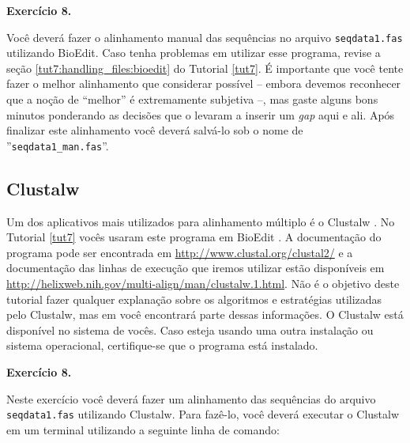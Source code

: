 \begin{refsection}
\begin{blackBlock}{\textbf{Exercício 8.}}\label{tut8:ex:8.1}

Você deverá fazer o alinhamento manual das sequências no arquivo \texttt{seqdata1.fas} utilizando BioEdit. Caso tenha problemas em utilizar esse programa, revise a seção \ref{tut7:handling_files:bioedit} do Tutorial \ref{tut7}. É importante que você tente fazer o melhor alinhamento que considerar possível -- embora devemos reconhecer que a noção de ``melhor'' é extremamente subjetiva --, mas gaste alguns bons minutos ponderando as decisões que o levaram a inserir um \textit{gap} aqui e ali. Após finalizar este alinhamento você deverá salvá-lo sob o nome de ''\texttt{seqdata1\_man.fas}''.

\end{blackBlock}

\subsection{Clustalw}\label{tut8:msa:clustalw}

Um dos aplicativos mais utilizados para alinhamento múltiplo é o Clustalw \parencite{Larkin_et_al_2007}. No Tutorial \ref{tut7} vocês usaram este programa em BioEdit \parencite{Hall_1999}. A documentação do programa pode ser encontrada em \url{http://www.clustal.org/clustal2/} e a documentação das linhas de execução que iremos utilizar estão disponíveis em \url{http://helixweb.nih.gov/multi-align/man/clustalw.1.html}. Não é o objetivo deste tutorial fazer qualquer explanação sobre os algoritmos e estratégias utilizadas pelo Clustalw, mas em \textcite{Phillips_et_al_2000} você encontrará parte dessas informações. O Clustalw está disponível no sistema de vocês. Caso esteja usando uma outra instalação ou sistema operacional, certifique-se que o programa está instalado.


\begin{blackBlock}{\textbf{Exercício 8.}}\label{tut8:ex:8.2}

Neste exercício você deverá fazer um alinhamento das sequências do arquivo \texttt{seqdata1.fas} utilizando Clustalw. Para fazê-lo, você deverá executar o Clustalw em um terminal utilizando a seguinte linha de comando:\\

\scriptsize
{}\\
\normalsize


\end{blackBlock}
\end{refsection}

